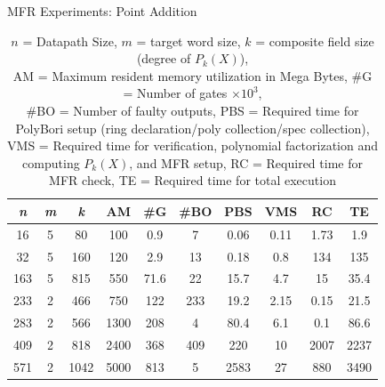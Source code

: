 \begin{frame}{\large MFR Experiments: Point Addition}

{\scriptsize
\begin{table}[bht]
\centering
\caption*{{\scriptsize $\textit{n}$ = Datapath Size, $\textit{m}$ = target word size, 
$\textit{k}$ = composite field size (degree of $P_k(X)$), 
\\AM = Maximum resident memory utilization in Mega Bytes,
\#G = Number of gates $\times 10^3$, \\ \#BO = Number of faulty outputs, 
PBS = Required time for PolyBori setup (ring declaration/poly collection/spec collection),
VMS = Required time for verification, polynomial factorization and computing $P_k(X)$, and MFR setup, 
RC = Required time for MFR check, TE = Required time for total execution}}
\label{pavsspec}
\begin{tabular}{| c | c | c | c | c | c | c | c | c | c |} \hline
{\textit{\textbf{n}}} & {\textit{\textbf{m}}} & {\textit{\textbf{k}}} & {\textbf{AM}} & {\textbf{\#G}} 
& {\textbf{\#BO}} & {\textbf{PBS}} & {\textbf{VMS}} & {\textbf{RC}} & {\textbf{TE}} \\ \hline 
16 & 5 & 80   & 100 & 0.9  & 7   & 0.06 & 0.11 & 1.73 & 1.9  \\ \hline
32  & 5 & 160  & 120 & 2.9  & 13  & 0.18 & 0.8  & 134  & 135  \\ \hline
163 & 5 & 815  & 550 & 71.6 & 22  & 15.7 & 4.7  & 15   & 35.4 \\ \hline
233 & 2 & 466  & 750 & 122  & 233 & 19.2 & 2.15 & 0.15 & 21.5 \\ \hline
\rowcolor{green}283 & 2 & 566  & 1300& 208  & 4   & 80.4 & 6.1  & 0.1  & 86.6 \\ \hline
\rowcolor{red}409 & 2 & 818  & 2400& 368  & 409 & 220  & 10   & 2007 & 2237 \\ \hline
571 & 2 & 1042 & 5000& 813  & 5   & 2583 & 27   & 880  & 3490 \\ \hline
\end{tabular}
\end{table}}

\end{frame}



